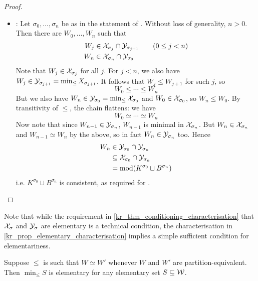 \begin{proof}
\begin{itemize}
    \item \acyc{}: Let $\sigma_0, \ldots, \sigma_n$ be as in the statement
          of \acyc{}. Without loss of generality, $n > 0$. Then there are
          $W_0, \ldots, W_n$ such that
          \begin{align*}
            W_j &\in \mathcal{X}_{\sigma_j} \cap \mathcal{Y}_{\sigma_{j+1}} \qquad (0 \le j < n) \\
            W_n &\in \mathcal{X}_{\sigma_n} \cap \mathcal{Y}_{\sigma_0}
          \end{align*}
          Note that $W_j \in \mathcal{X}_{\sigma_j}$ for all $j$. For $j < n$, we also
          have $W_j \in \mathcal{Y}_{\sigma_{j+1}} = \min_{\le}{X_{\sigma_{j+1}}}$. It
          follows that $W_j \le W_{j+1}$ for such $j$, so
          \[
            W_0 \le \cdots \le W_n
          \]
          But we also have $W_n \in \mathcal{Y}_{\sigma_0} = \min_{\le}{\mathcal{X}_{\sigma_0}}$
          and $W_0 \in \mathcal{X}_{\sigma_0}$, so $W_n \le W_0$. By transitivity of
          $\le$, the chain flattens: we have
          \[
            W_0 \simeq \cdots \simeq W_n
          \]
          Now note that since $W_{n-1} \in \mathcal{Y}_{\sigma_n}$, $W_{n - 1}$ is
          minimal in $\mathcal{X}_{\sigma_n}$. But $W_n \in \mathcal{X}_{\sigma_n}$ and $W_{n -
          1} \simeq W_n$ by the above, so in fact $W_n \in \mathcal{Y}_{\sigma_n}$ too.
          Hence
          \begin{align*}
            W_n
            &\in \mathcal{Y}_{\sigma_0} \cap \mathcal{Y}_{\sigma_n} \\
            &\subseteq \mathcal{X}_{\sigma_0} \cap \mathcal{Y}_{\sigma_n} \\
            &= \operatorname{mod}(K^{\sigma_0} \sqcup B^{\sigma_n})
          \end{align*}
          i.e. $K^{\sigma_0} \sqcup B^{\sigma_n}$ is consistent, as required
          for \acyc{}.
\end{itemize}
\end{proof}

Note that while the requirement in \cref{kr_thm_conditioning_characterisation}
that $\mathcal{X}_{\sigma}$ and $\mathcal{Y}_{\sigma}$ are elementary is a technical
condition,\footnotemark{} the characterisation in
\cref{kr_prop_elementary_characterisation} implies a simple sufficient condition
for elementariness.
%

\begin{proposition}
    \label{kr_prop_partition_equiv_tpo_implies_elementariness}
    Suppose $\le$ is such that $W \simeq W'$ whenever $W$ and $W'$ are
    partition-equivalent. Then $\min_{\le}{S}$ is elementary for any
    elementary set $S \subseteq \mathcal{W}$.
\end{proposition}

